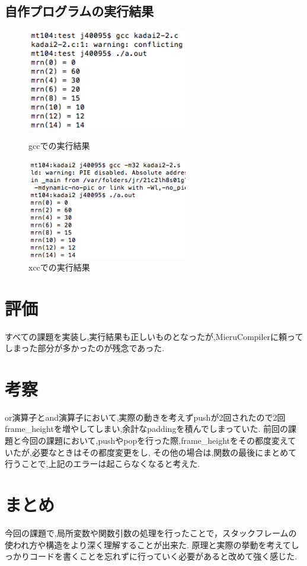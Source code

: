 \documentclass[10pt]{jsarticle}
\begin{document}
\subsection{自作プログラムの実行結果}
\begin{figure}[htbp]
 \begin{minipage}{0.5\hsize}
  \begin{center}
   \includegraphics[width=70mm]{kadai2-2-gcc.png}
  \end{center}
  \caption{gccでの実行結果}
 \end{minipage}
 \begin{minipage}{0.5\hsize}
  \begin{center}
   \includegraphics[width=70mm]{kadai2-2-xcc.png}
  \end{center}
  \caption{xccでの実行結果}
 \end{minipage}
\end{figure}

\section{評価}
すべての課題を実装し,実行結果も正しいものとなったが,MieruCompilerに頼ってしまった部分が多かったのが残念であった.

\section{考察}
or演算子とand演算子において,実際の動きを考えずpushが2回されたので2回frame\_heightを増やしてしまい,余計なpaddingを積んでしまっていた.
前回の課題と今回の課題において,pushやpopを行った際,frame\_heightをその都度変えていたが,必要なときはその都度変更をし,
その他の場合は,関数の最後にまとめて行うことで,上記のエラーは起こらなくなると考えた.

\section{まとめ}
今回の課題で,局所変数や関数引数の処理を行ったことで，スタックフレームの使われ方や構造をより深く理解することが出来た.
原理と実際の挙動を考えてしっかりコードを書くことを忘れずに行っていく必要があると改めて強く感じた.
\end{document}
